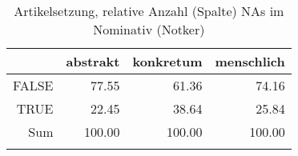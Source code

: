 \begin{table}[ht]
\centering
\begin{tabular}{rrrr}
  \lsptoprule
 & abstrakt & konkretum & menschlich \\ 
  \midrule
FALSE & 77.55 & 61.36 & 74.16 \\ 
  TRUE & 22.45 & 38.64 & 25.84 \\ 
  Sum & 100.00 & 100.00 & 100.00 \\ 
   \lspbottomrule
\end{tabular}
\caption{Artikelsetzung, relative Anzahl (Spalte) NAs im Nominativ (Notker)} 
\end{table}
